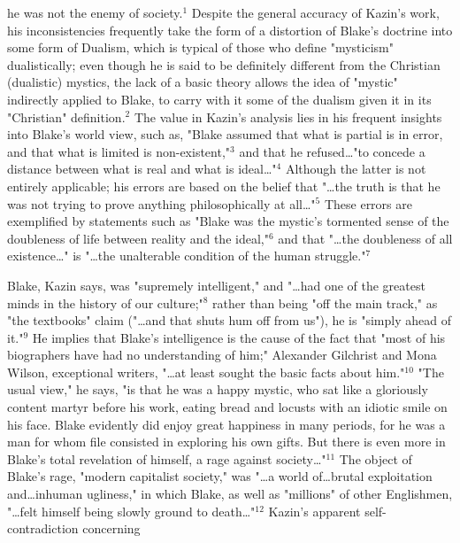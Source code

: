 \noindent he was not the enemy of society.$^{1}$ Despite the general accuracy of Kazin's work, his inconsistencies frequently take the form of a 
distortion of Blake's doctrine into some form of Dualism, which is typical of those who define "mysticism" dualistically;
even though he is said to be definitely different from the Christian (dualistic) mystics, the lack of a basic theory
allows the idea of "mystic" indirectly applied to Blake, to carry with it some of the dualism given it in its "Christian"
definition.$^{2}$ The value in Kazin's analysis lies in his frequent insights into Blake's world view, such as, "Blake
assumed that what is partial is in error, and that what is limited is non-existent,"$^{3}$ and that he refused\dots"to concede a 
distance between what is real and what is ideal\dots"$^{4}$ Although the latter is not entirely applicable; his errors are based
on the belief that "\dots the truth is that he was not trying to prove anything philosophically at all\dots"$^{5}$ These errors
are exemplified by statements such as "Blake was the mystic's tormented sense of the doubleness of life between reality and the ideal,"$^{6}$ and
that "\dots the doubleness of all existence\dots" is "\dots the unalterable condition of the human struggle."$^{7}$\par
\vspace*{0.5\baselineskip}
Blake, Kazin says, was "supremely intelligent," and "\dots had one of the greatest minds in the history of our culture;"$^{8}$
rather than being "off the main track," as "the textbooks" claim ("\dots and that shuts hum off from us"), he is "simply
ahead of it."$^{9}$ He implies that Blake's intelligence is the cause of the fact that "most of his biographers have had no 
understanding of him;" Alexander Gilchrist and Mona Wilson, exceptional writers, "\dots at least sought the basic facts about him."$^{10}$ "The usual view," he says,
"is that he was a happy mystic, who sat like a gloriously content martyr before his work, eating bread and locusts with an idiotic smile
on his face. Blake evidently did enjoy great happiness in many periods, for he was a man for whom file consisted in exploring his own
gifts. But there is even more in Blake's total revelation of himself, a rage against society\dots"$^{11}$ The object of Blake's rage, "modern capitalist
society," was "\dots a world of\dots brutal exploitation and\dots inhuman ugliness," in which Blake, as well
as "millions" of other Englishmen, "\dots felt himself being slowly ground to death\dots"$^{12}$ Kazin's apparent self-contradiction concerning
